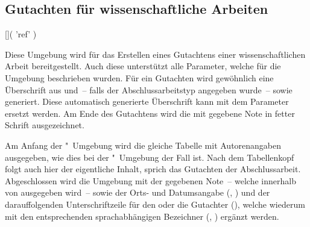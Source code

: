 \begin{Entity*}{}
\section{%
  Gutachten für wissenschaftliche Arbeiten%
}
\begin{Declaration}{[]}(%
  'ref'%
)
\begin{Declaration}{%
}
\begin{Declaration}{}
\printdeclarationlist%
%
Diese Umgebung wird für das Erstellen eines Gutachtens einer wissenschaftlichen 
Arbeit bereitgestellt. Auch diese unterstützt alle Parameter, welche für die 
Umgebung  beschrieben wurden. Für ein Gutachten wird 
gewöhnlich eine Überschrift aus  und~-- falls der 
Abschlussarbeitstyp angegeben wurde~--  sowie 
 generiert. Diese automatisch generierte Überschrift kann mit dem 
Parameter  ersetzt werden. Am Ende des 
Gutachtens wird die mit  gegebene Note in 
fetter Schrift ausgezeichnet.

Am Anfang der "~Umgebung wird die gleiche Tabelle mit 
Autorenangaben ausgegeben, wie dies bei der "~Umgebung der 
Fall ist. Nach dem Tabellenkopf folgt auch hier der eigentliche Inhalt, sprich 
das Gutachten der Abschlussarbeit. Abgeschlossen wird die Umgebung mit der 
gegebenen Note~-- welche innerhalb von  ausgegeben wird~-- 
sowie der Orts- und Datumsangabe (, ) und der 
darauffolgenden Unterschriftzeile für den oder die Gutachter (), 
welche wiederum mit den entsprechenden sprachabhängigen Bezeichner 
(, ) ergänzt werden.
\end{Declaration}
\end{Declaration}
\end{Declaration}


\end{Entity*}
